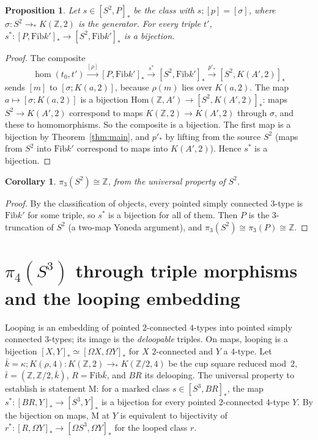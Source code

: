 \documentclass[11pt]{amsart}
\newtheorem{proposition}[theorem]{Proposition}
\newtheorem{corollary}[theorem]{Corollary}
\theoremstyle{definition}
\theoremstyle{remark}
\newcommand{\Om}{\Omega}
\newcommand{\Fib}{\mathrm{Fib}}
\newcommand{\Hom}{\mathrm{Hom}}
\newcommand{\rmap}{\rho}
\newcommand{\Z}{\mathbb{Z}}
\newcommand{\cls}[1]{[#1]}
\newcommand{\cmp}{\mathbin{;}}
\begin{document}
\begin{proposition}\label{prop:mark3}
Let $s\in[S^2,P]_*$ be the class with $s\cmp\cls p=\cls\sigma$, where
$\sigma:S^2\to_*K(\Z,2)$ is the generator. For every triple $t'$,
$s^*:[P,\Fib k']_*\to[S^2,\Fib k']_*$ is a bijection.
\end{proposition}
\begin{proof}
The composite
\[\hom(t_0,t')\xrightarrow{\cls\rmap}[P,\Fib k']_*\xrightarrow{s^*}[S^2,\Fib k']_*\xrightarrow{p'_*}[S^2,K(A',2)]_*\]
sends $\cls m$ to $\cls{\sigma\cmp K(a,2)}$, because $\rmap(m)$ lies over
$K(a,2)$. The map $a\mapsto\cls{\sigma\cmp K(a,2)}$ is a bijection
$\Hom(\Z,A')\to[S^2,K(A',2)]_*$: maps $S^2\to K(A',2)$ correspond to maps
$K(\Z,2)\to K(A',2)$ through $\sigma$, and these to homomorphisms. So the
composite is a bijection. The first map is a bijection by
Theorem~\ref{thm:main}, and $p'_*$ by lifting from the source $S^2$ (maps from
$S^2$ into $\Fib k'$ correspond to maps into $K(A',2)$). Hence $s^*$ is a
bijection.
\end{proof}

\begin{corollary}
$\pi_3(S^2)\cong\Z$, from the universal property of $S^2$.
\end{corollary}
\begin{proof}
By the classification of objects, every pointed simply connected $3$-type is
$\Fib k'$ for some triple, so $s^*$ is a bijection for all of them. Then $P$ is
the $3$-truncation of $S^2$ (a two-map Yoneda argument), and
$\pi_3(S^2)\cong\pi_3(P)\cong\Z$.
\end{proof}

\section{$\pi_4(S^3)$ through triple morphisms and the looping embedding}\label{sec:pi4}

Looping is an embedding of pointed $2$-connected $4$-types into pointed simply
connected $3$-types; its image is the \emph{deloopable} triples. On maps,
looping is a bijection $[X,Y]_*\simeq[\Om X,\Om Y]_*$ for $X$ $2$-connected and
$Y$ a $4$-type. Let $\bar k=\kappa\cmp K(\rho,4):K(\Z,2)\to_*K(\Z/2,4)$ be the
cup square reduced mod~$2$, $\bar t=(\Z,\Z/2,\bar k)$, $R=\Fib\bar k$, and $BR$
its delooping. The universal property to establish is statement M: for a
marked class $s\in[S^3,BR]_*$, the map $s^*:[BR,Y]_*\to[S^3,Y]_*$ is a bijection
for every pointed $2$-connected $4$-type $Y$. By the bijection on maps, M at
$Y$ is equivalent to bijectivity of $r^*:[R,\Om Y]_*\to[\Om S^3,\Om Y]_*$ for the
looped class $r$.
\end{document}
